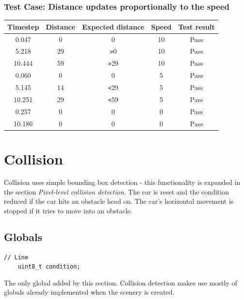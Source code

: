 \documentclass{article}
\begin{document}
\subsubsection*{Test Case: Distance updates proportionally to the speed}
\begin{center}
\begin{tabular}{ c c c c c }
Timestep	& Distance	& Expected distance	& Speed	& Test result		\\ \hline
0.047		& 0		& 0				& 10		& Pass		\\
5.218		& 29		& \verb|>|0			& 10		& Pass		\\
10.444	& 59		& \verb|>|29		& 10		& Pass		\\
0.060		& 0		& 0				& 5		& Pass		\\
5.145		& 14		& \verb|<|29		& 5		& Pass		\\
10.251	& 29		& \verb|<|59		& 5		& Pass		\\
0.257		& 0		& 0				& 0		& Pass		\\
10.186	& 0		& 0				& 0		& Pass		\\ \hline
\end{tabular}
\end{center}

\clearpage

\section{Collision}
Collision uses simple bounding box detection - this functionality is expanded in the section \emph{Pixel-level collision detection}. The car is reset and the condition reduced if the car hits an obstacle head on. The car's horizontal movement is stopped if it tries to move into an obstacle. 

\subsection*{Globals}
\begin{lstlisting}[style=CStyle]
	// Line 
	uint8_t condition;
\end{lstlisting}
The only global added by this section. Collision detection makes use mostly of globals already implemented when the scenery is created. 
\newline
\end{document}
